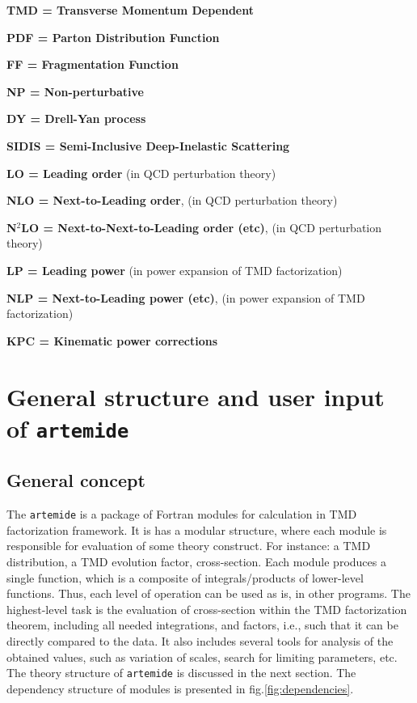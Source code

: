 \documentclass[prd,nofootinbib,eqsecnum,final]{revtex4}
\renewcommand{\(}{\left(}
\renewcommand{\)}{\right)}
\renewcommand{\[}{\left[}
\renewcommand{\]}{\right]}
\begin{document}
\textbf{TMD = Transverse Momentum Dependent}

\textbf{PDF = Parton Distribution Function}

\textbf{FF = Fragmentation Function}

\textbf{NP = Non-perturbative}

\textbf{DY = Drell-Yan process}

\textbf{SIDIS = Semi-Inclusive Deep-Inelastic Scattering}

\textbf{LO = Leading order} (in QCD perturbation theory)

\textbf{NLO = Next-to-Leading order}, (in QCD perturbation theory)

\textbf{N$^2$LO = Next-to-Next-to-Leading order (etc)}, (in QCD perturbation theory)

\textbf{LP = Leading power} (in power expansion of TMD factorization)

\textbf{NLP = Next-to-Leading power (etc)}, (in power expansion of TMD factorization)

\textbf{KPC = Kinematic power corrections}

\newpage

\section{General structure and user input of \texttt{artemide}}

\subsection{General concept}

The \texttt{artemide} is a package of Fortran modules for calculation in TMD factorization framework. It is has a modular structure, where each module is responsible for evaluation of some theory construct. For instance: a TMD distribution, a TMD evolution factor, cross-section. Each module produces a single function, which is a composite of integrals/products of lower-level functions. Thus, each level of operation can be used as is, in other programs. The highest-level task is the evaluation of cross-section within the TMD factorization theorem, including all needed integrations, and factors, i.e., such that it can be directly compared to the data. It also includes several tools for analysis of the obtained values, such as variation of scales, search for limiting parameters, etc. The theory structure of \texttt{artemide} is discussed in the next section. The dependency structure of modules is presented in fig.\ref{fig:dependencies}.
\end{document}
